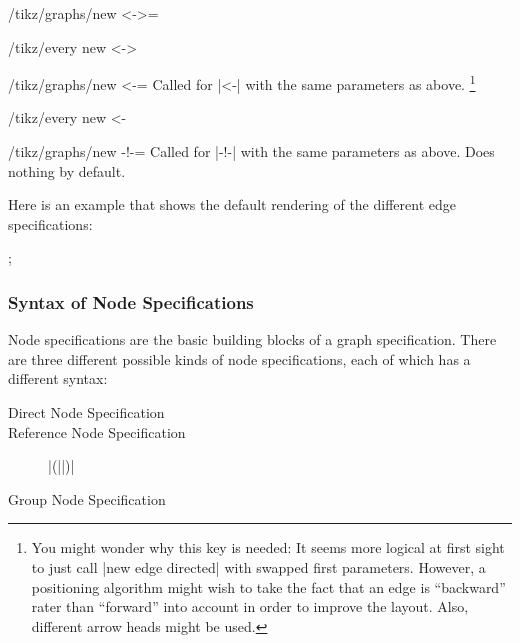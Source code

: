 \begin{enumerate}
\begin{key}{/tikz/graphs/new <->=}
\begin{stylekey}{/tikz/every new <->}
    \end{stylekey}
  \end{key}
  \begin{key}{/tikz/graphs/new <-=}
    Called for |<-| with the same parameters as above.%
    \footnote{You might
      wonder why this key is needed: It seems more logical at first
      sight to just call |new edge directed| with swapped first
      parameters. However, a positioning
      algorithm might wish to take the fact that an edge is
      ``backward'' rater than ``forward'' into account in order to
      improve the layout. Also, different arrow heads might be used.}
    \begin{stylekey}{/tikz/every new <-}
    \end{stylekey}
  \end{key}
  \begin{key}{/tikz/graphs/new -!-=}
    Called for |-!-| with the same parameters as above. Does nothing
    by default.
  \end{key}
\end{enumerate}

Here is an example that shows the default rendering of the different
edge specifications:

\begin{codeexample}[]
\tikz {};  
\end{codeexample}


\subsubsection{Syntax of Node Specifications}

\label{section-library-graphs-node-spec}

Node specifications are the basic building blocks of a graph
specification. There are three different possible kinds of node
specifications, each of which has a different syntax: 

\begin{description}
\item[Direct Node Specification]  
\item[Reference Node Specification] |(||)|
\item[Group Node Specification] 
\end{description}

